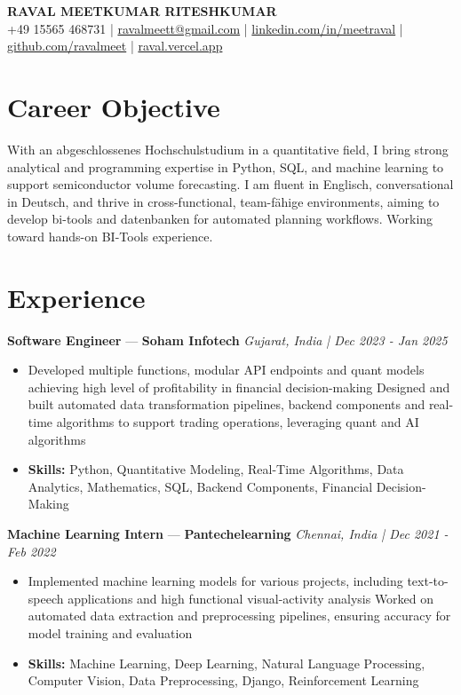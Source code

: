 \documentclass[a4paper,10pt]{article}
\begin{document}
\begin{center}
  {\Large\bfseries RAVAL MEETKUMAR RITESHKUMAR}\\[2pt]
  {\small +49 15565 468731 \;|\; \href{mailto:ravalmeett@gmail.com}{ravalmeett@gmail.com} \;|\; \href{https://www.linkedin.com/in/meetraval/}{linkedin.com/in/meetraval} \;|\; \href{https://github.com/ravalmeet}{github.com/ravalmeet} \;|\; \href{https://raval.vercel.app/}{raval.vercel.app}}
\end{center}
\vspace{-3pt}

\section*{Career Objective}
With an abgeschlossenes Hochschulstudium in a quantitative field, I bring strong analytical and programming expertise in Python, SQL, and machine learning to support semiconductor volume forecasting. I am fluent in Englisch, conversational in Deutsch, and thrive in cross-functional, team-fähige environments, aiming to develop bi-tools and datenbanken for automated planning workflows. Working toward hands-on BI-Tools experience.\par

\section*{Experience}
\textbf{Software Engineer} — \textbf{Soham Infotech} \hfill \textit{Gujarat, India \;|\; Dec 2023 - Jan 2025}\par
\vspace{1pt}
\begin{itemize}
  \item Developed multiple functions, modular API endpoints and quant models achieving high level of profitability in financial decision-making Designed and built automated data transformation pipelines, backend components and real-time algorithms to support trading operations, leveraging quant and AI algorithms
  \item \textbf{Skills:} Python, Quantitative Modeling, Real-Time Algorithms, Data Analytics, Mathematics, SQL, Backend Components, Financial Decision-Making
\end{itemize}
\vspace{3pt}
\textbf{Machine Learning Intern} — \textbf{Pantechelearning} \hfill \textit{Chennai, India \;|\; Dec 2021 - Feb 2022}\par
\vspace{1pt}
\begin{itemize}
  \item Implemented machine learning models for various projects, including text-to-speech applications and high functional visual-activity analysis Worked on automated data extraction and preprocessing pipelines, ensuring accuracy for model training and evaluation
  \item \textbf{Skills:} Machine Learning, Deep Learning, Natural Language Processing, Computer Vision, Data Preprocessing, Django, Reinforcement Learning
\end{itemize}
\end{document}
